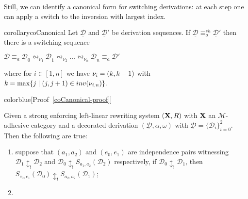 \documentclass[a4paper,UKenglish,cleveref,pdftex,thm-restate,numberwithinsect]{lipics-v2021}
\newcommand{\full}[1]{{color{blue}#1}}
\newcommand{\full}[1]{}
\newcommand{\interval}[2][1]{\ensuremath{[{#1},{#2}]}}
\def\R{\mathsf{R}}
\def\X{\textbf {\textup{X}}}
\newcommand{\dder}[1]{\mathscr{#1}}
\newcommand{\der}[1]{\underline{\dder{#1}}}
\newcommand{\inv}[1]{\mathsf{inv}({#1})}
\newcommand{\shift}[1]{\ensuremath{\mathrel{{\leftrightsquigarrow}_{#1}}}}
\newcommand{\shifteq}[1][]{\ensuremath{\mathrel{{\equiv}^\mathit{sh}_{#1}}}}
\begin{document}
Still, we can identify a
canonical form for switching derivations: at each step one can apply a switch to the inversion with largest index. 


\begin{restatable}{corollary}{coCanonical}
  \label{co:canonical}
  Let $\der{D}$ and $\der{D}'$ be derivation sequences. If
  $\der{D} \shifteq[\sigma]\der{D}'$ then there is a switching sequence
  \begin{center}
    $\der{D} \equiv_a \der{D}_0 \shift{\nu_1} \der{D}_1 \shift{\nu_2} \ldots
    \shift{\nu_n} \der{D}_n \equiv_a\der{D}'$
  \end{center}
  where for $i \in \interval{n}$ we have $\nu_i  = \transp{k}$ with 
  $k = \max \{ j \mid \transp{j} \in \inv{\nu_{i,n}}\}$.
\end{restatable}

\full{[Proof~\ref{coCanonical-proof}]}

\iffalse
	\begin{corollary} Given a strong enforcing  left-linear rewriting system  $(\X,\R)$ with $\X$ an $\mathcal{M}$-adhesive category and a decorated derivation $(\der{D}, \alpha, \omega)$ with $\der{D}=\{\dder{D}_i\}_{i=0}^2$. Then the following are true:
		\begin{enumerate}
			\item suppose that $(a_1,a_2)$ and $(e_0,e_1)$ are independence pairs witnessing  $\dder{D}_1\updownarrow_! \dder{D}_2$ and $\dder{D}_0\updownarrow_! S_{a_1,a_2}(\dder{D}_2)$ respectively, if $\dder{D}_0\updownarrow_!\dder{D}_1$, then $S_{e_0,e_1}(\dder{D}_0)\updownarrow_!S_{a_2,a_2}(\dder{D}_1)$;
			\item
		\end{enumerate}
	\end{corollary}
\end{document}
